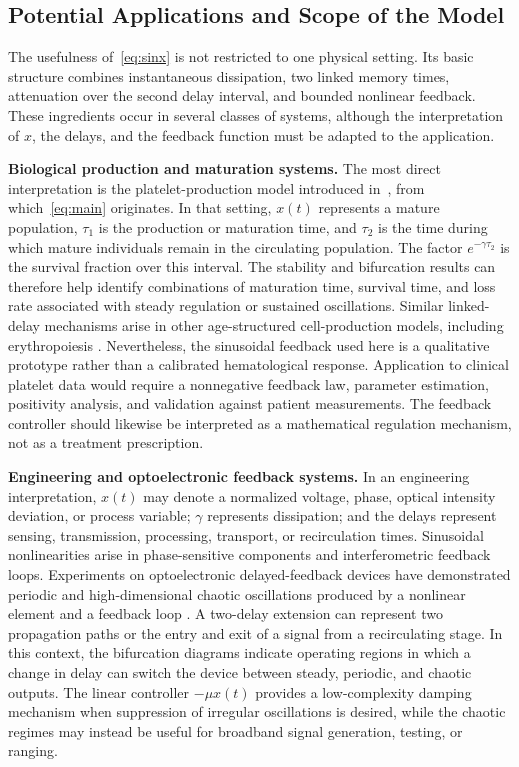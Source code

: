 \documentclass[11pt]{article}
\theoremstyle{remark}
\begin{document}
{
\subsection*{Potential Applications and Scope of the Model}

The usefulness of~\eqref{eq:sinx} is not restricted to one physical setting. Its basic structure combines instantaneous dissipation, two linked memory times, attenuation over the second delay interval, and bounded nonlinear feedback. These ingredients occur in several classes of systems, although the interpretation of $x$, the delays, and the feedback function must be adapted to the application.

\textbf{Biological production and maturation systems.}
The most direct interpretation is the platelet-production model introduced in~\cite{boullu2020stability}, from which~\eqref{eq:main} originates. In that setting, $x(t)$ represents a mature population, $\tau_1$ is the production or maturation time, and $\tau_2$ is the time during which mature individuals remain in the circulating population. The factor $e^{-\gamma\tau_2}$ is the survival fraction over this interval. The stability and bifurcation results can therefore help identify combinations of maturation time, survival time, and loss rate associated with steady regulation or sustained oscillations. Similar linked-delay mechanisms arise in other age-structured cell-production models, including erythropoiesis \cite{belair1995age}. Nevertheless, the sinusoidal feedback used here is a qualitative prototype rather than a calibrated hematological response. Application to clinical platelet data would require a nonnegative feedback law, parameter estimation, positivity analysis, and validation against patient measurements. The feedback controller should likewise be interpreted as a mathematical regulation mechanism, not as a treatment prescription.

\textbf{Engineering and optoelectronic feedback systems.}
In an engineering interpretation, $x(t)$ may denote a normalized voltage, phase, optical intensity deviation, or process variable; $\gamma$ represents dissipation; and the delays represent sensing, transmission, processing, transport, or recirculation times. Sinusoidal nonlinearities arise in phase-sensitive components and interferometric feedback loops. Experiments on optoelectronic delayed-feedback devices have demonstrated periodic and high-dimensional chaotic oscillations produced by a nonlinear element and a feedback loop \cite{blakely2004highspeed}. A two-delay extension can represent two propagation paths or the entry and exit of a signal from a recirculating stage. In this context, the bifurcation diagrams indicate operating regions in which a change in delay can switch the device between steady, periodic, and chaotic outputs. The linear controller $-\mu x(t)$ provides a low-complexity damping mechanism when suppression of irregular oscillations is desired, while the chaotic regimes may instead be useful for broadband signal generation, testing, or ranging.

}
\end{document}
